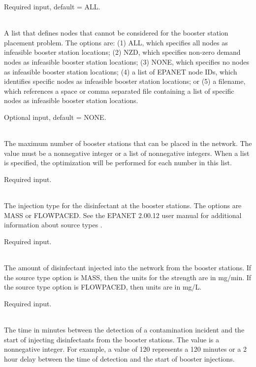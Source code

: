 \begin{description}[topsep=0pt,parsep=0.5em,itemsep=-0.4em]
\begin{description}[topsep=0pt,parsep=0.5em,itemsep=-0.4em]
                Required input, default = ALL.
    \item[{infeasible nodes}]\hfill
\\A list that defines nodes that cannot be considered for the booster station placement problem.
                The options are: (1) ALL, which specifies all nodes as infeasible booster station locations;
                (2) NZD, which specifies non-zero demand nodes as infeasible booster station locations;
                (3) NONE, which specifies no nodes as infeasible booster station locations;
                (4) a list of EPANET node IDs, which identifies specific nodes as infeasible booster station locations; or
                (5) a filename, which references a space or comma separated file containing a list of 
                specific nodes as infeasible booster station locations. 
                
                Optional input, default = NONE.
    \item[{max boosters}]\hfill
\\The maximum number of booster stations that can be placed in the
                network. The value must be a nonnegative integer or a list of
                nonnegative integers. When a list is specified, the optimization
                will be performed for each number in this list.
                
                Required input.
    \item[{type}]\hfill
\\The injection type for the disinfectant at the booster stations. 
                The options are MASS or FLOWPACED. 
                See the EPANET 2.00.12 user manual for additional information about source types \cite{EPANETusermanual}.
                
                Required input.
    \item[{strength}]\hfill
\\The amount of disinfectant injected into the network from the booster stations.  
                If the source type option is MASS, then the units for the strength are in mg/min.  
                If the source type option is FLOWPACED, then units are in mg/L.
                
                Required input.
    \item[{response time}]\hfill
\\The time in minutes between the detection of a contamination incident and 
                the start of injecting disinfectants from the booster stations. The value 
                is a nonnegative integer. For example, a value of 120 represents 
                a 120 minutes or a 2 hour delay between the time of detection and 
                the start of booster injections.
				

\end{description}
\end{description}
